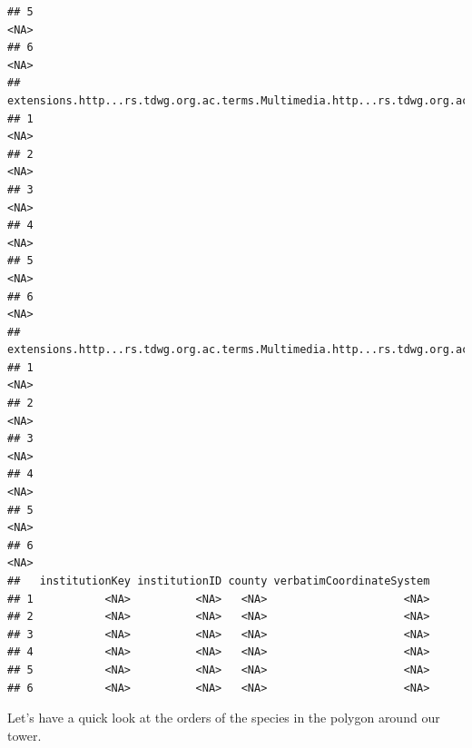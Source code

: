 \documentclass[
]{book}
\begin{document}
\begin{verbatim}
## 5                                                                                <NA>
## 6                                                                                <NA>
##   extensions.http...rs.tdwg.org.ac.terms.Multimedia.http...rs.tdwg.org.ac.terms.variantLiteral.4
## 1                                                                                           <NA>
## 2                                                                                           <NA>
## 3                                                                                           <NA>
## 4                                                                                           <NA>
## 5                                                                                           <NA>
## 6                                                                                           <NA>
##   extensions.http...rs.tdwg.org.ac.terms.Multimedia.http...rs.tdwg.org.ac.terms.accessURI.4
## 1                                                                                      <NA>
## 2                                                                                      <NA>
## 3                                                                                      <NA>
## 4                                                                                      <NA>
## 5                                                                                      <NA>
## 6                                                                                      <NA>
##   institutionKey institutionID county verbatimCoordinateSystem
## 1           <NA>          <NA>   <NA>                     <NA>
## 2           <NA>          <NA>   <NA>                     <NA>
## 3           <NA>          <NA>   <NA>                     <NA>
## 4           <NA>          <NA>   <NA>                     <NA>
## 5           <NA>          <NA>   <NA>                     <NA>
## 6           <NA>          <NA>   <NA>                     <NA>
\end{verbatim}

Let's have a quick look at the orders of the species in the polygon around our tower.
\end{document}
